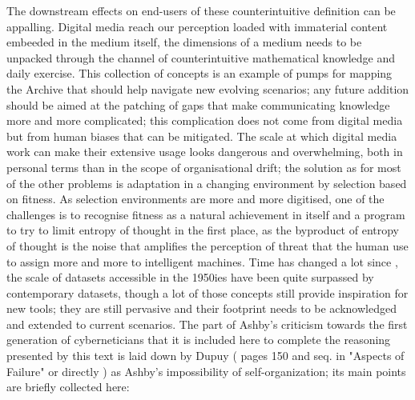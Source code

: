 \documentclass[14pt]{extarticle}
\begin{document}
\hspace*{15mm}The downstream effects on end-users of these counterintuitive definition can be appalling. Digital media reach our perception loaded with immaterial content embeeded in the medium itself, the dimensions of a medium needs to be unpacked through the channel of counterintuitive mathematical knowledge and daily exercise. This collection of concepts is an example of pumps for mapping the Archive that should help navigate new evolving scenarios; any future addition should be aimed at the patching of gaps that make communicating knowledge more and more complicated; this complication does not come from digital media but from human biases that can be mitigated. The scale at which digital media work can make their extensive usage looks dangerous and overwhelming, both in personal terms than in the scope of organisational drift; the solution as for most of the other problems is adaptation in a changing environment by selection based on fitness. As selection environments are more and more digitised, one of the challenges is to recognise fitness as a natural achievement in itself and a program to try to limit entropy of thought in the first place, as the byproduct of entropy of thought is the noise that amplifies the perception of threat that the human use to assign more and more to intelligent machines.
\newline
\hspace*{15mm}Time has changed a lot since \cite{ashby2014design}, the scale of datasets accessible in the 1950ies have been quite surpassed by contemporary datasets, though a lot of those concepts still provide inspiration for new tools; they are still pervasive and their footprint needs to be acknowledged and extended to current scenarios. The part of Ashby's criticism towards the first generation of cyberneticians that it is included here to complete the reasoning presented by this text is laid down by Dupuy (\cite{DUPUYmechanization} pages 150 and seq. in "Aspects of Failure" or directly \cite{ashby1991principles}) as Ashby's impossibility of self-organization; its main points are briefly collected here:
\end{document}
